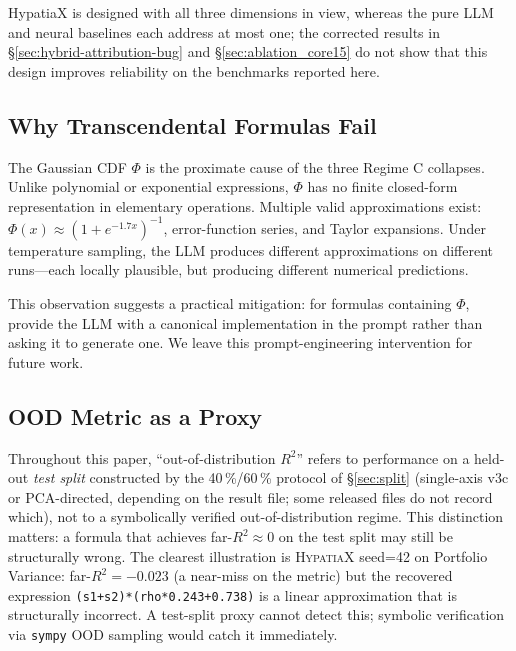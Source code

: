 \documentclass[twoside,11pt]{article}
\newcommand{\Rsq}{R^{2}}
\begin{document}
HypatiaX is designed with all three dimensions in view, whereas the pure LLM and neural baselines
each address at most one; the corrected results in \S\ref{sec:hybrid-attribution-bug} and
\S\ref{sec:ablation_core15} do not show that this design improves reliability on the benchmarks reported here.

\subsection{Why Transcendental Formulas Fail}\label{subsec:why-transcendental-formulas-fail}
\label{sec:disc_transcendental}

The Gaussian CDF $\Phi$ is the proximate cause of the three Regime C collapses.
Unlike polynomial or exponential expressions, $\Phi$ has no finite closed-form
representation in elementary operations.  Multiple valid approximations exist:
$\Phi(x) \approx (1 + e^{-1.7x})^{-1}$, error-function series, and Taylor
expansions.  Under temperature sampling, the LLM produces different approximations
on different runs---each locally plausible, but producing different numerical
predictions.

This observation suggests a practical mitigation: for formulas containing $\Phi$,
provide the LLM with a canonical implementation in the prompt rather than asking it
to generate one.  We leave this prompt-engineering intervention for future work.

\subsection{OOD Metric as a Proxy}\label{subsec:ood-metric-as-a-proxy}
\label{sec:ood_proxy}

Throughout this paper, ``out-of-distribution $\Rsq$'' refers to performance on a
held-out \emph{test split} constructed by the 40\,\%/60\,\% protocol of
\S\ref{sec:split} (single-axis v3c or PCA-directed, depending on the result
file; some released files do not record which), not to a
symbolically verified out-of-distribution regime.  This distinction matters: a
formula that achieves far-$\Rsq \approx 0$ on the test split may still be
structurally wrong.  The clearest illustration is \textsc{HypatiaX} seed=42 on
Portfolio Variance: far-$\Rsq = -0.023$ (a near-miss on the metric) but the
recovered expression \texttt{(s1+s2)*(rho*0.243+0.738)} is a linear approximation
that is structurally incorrect.  A test-split proxy cannot detect this; symbolic
verification via \texttt{sympy} OOD sampling would catch it immediately.
\end{document}
